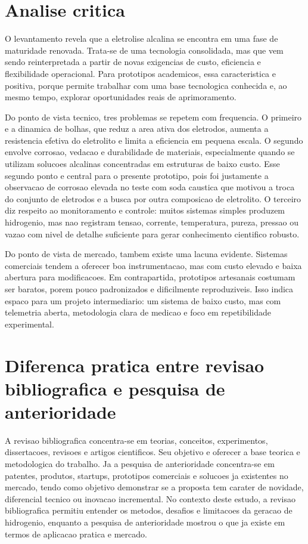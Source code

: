 \documentclass[12pt,oneside,a4paper,english,brazilian]{abntex2}
\begin{document}
\section{Analise critica}

O levantamento revela que a eletrolise alcalina se encontra em uma fase de maturidade renovada. Trata-se de uma tecnologia consolidada, mas que vem sendo reinterpretada a partir de novas exigencias de custo, eficiencia e flexibilidade operacional. Para prototipos academicos, essa caracteristica e positiva, porque permite trabalhar com uma base tecnologica conhecida e, ao mesmo tempo, explorar oportunidades reais de aprimoramento.

Do ponto de vista tecnico, tres problemas se repetem com frequencia. O primeiro e a dinamica de bolhas, que reduz a area ativa dos eletrodos, aumenta a resistencia efetiva do eletrolito e limita a eficiencia em pequena escala. O segundo envolve corrosao, vedacao e durabilidade de materiais, especialmente quando se utilizam solucoes alcalinas concentradas em estruturas de baixo custo. Esse segundo ponto e central para o presente prototipo, pois foi justamente a observacao de corrosao elevada no teste com soda caustica que motivou a troca do conjunto de eletrodos e a busca por outra composicao de eletrolito. O terceiro diz respeito ao monitoramento e controle: muitos sistemas simples produzem hidrogenio, mas nao registram tensao, corrente, temperatura, pureza, pressao ou vazao com nivel de detalhe suficiente para gerar conhecimento cientifico robusto.

Do ponto de vista de mercado, tambem existe uma lacuna evidente. Sistemas comerciais tendem a oferecer boa instrumentacao, mas com custo elevado e baixa abertura para modificacoes. Em contrapartida, prototipos artesanais costumam ser baratos, porem pouco padronizados e dificilmente reproduziveis. Isso indica espaco para um projeto intermediario: um sistema de baixo custo, mas com telemetria aberta, metodologia clara de medicao e foco em repetibilidade experimental.

\section{Diferenca pratica entre revisao bibliografica e pesquisa de anterioridade}

A revisao bibliografica concentra-se em teorias, conceitos, experimentos, dissertacoes, revisoes e artigos cientificos. Seu objetivo e oferecer a base teorica e metodologica do trabalho. Ja a pesquisa de anterioridade concentra-se em patentes, produtos, startups, prototipos comerciais e solucoes ja existentes no mercado, tendo como objetivo demonstrar se a proposta tem carater de novidade, diferencial tecnico ou inovacao incremental. No contexto deste estudo, a revisao bibliografica permitiu entender os metodos, desafios e limitacoes da geracao de hidrogenio, enquanto a pesquisa de anterioridade mostrou o que ja existe em termos de aplicacao pratica e mercado.
\end{document}
